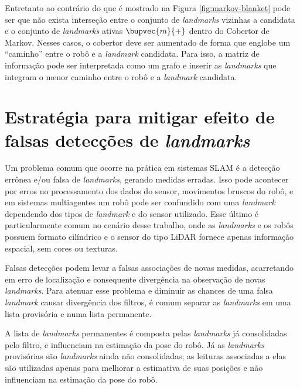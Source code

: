 Entretanto ao contrário do que é mostrado na Figura \ref{fig:markov-blanket} 
pode ser que não exista interseção entre o conjunto de \textit{landmarks} 
vizinhas a candidata e o conjunto de \textit{landmarks} ativas $\bupvec{m}{+}$ 
dentro do Cobertor de Markov. Nesses casos, o cobertor deve ser aumentado de 
forma que englobe um ``caminho'' entre o robô e a \textit{landmark} candidata. 
Para isso, a matriz de informação pode ser interpretada como um grafo e inserir 
as \textit{landmarks} que integram o menor caminho entre o robô e a 
\textit{landmark} candidata.

\section{Estratégia para mitigar efeito de falsas detecções de \textit{landmarks}}
\label{sec:false-detection-handling-strategy}
Um problema comum que ocorre na prática em sistemas SLAM é a detecção 
errônea e/ou falsa de \textit{landmarks}, gerando medidas erradas. Isso pode 
acontecer por erros no processamento dos dados do sensor, movimentos bruscos 
do robô, e em sistemas multiagentes um robô pode ser confundido com uma \textit{landmark} dependendo dos tipos de \textit{landmark} e do sensor utilizado. 
Esse último é particularmente comum no cenário desse trabalho, onde as \textit{landmarks} e os robôs possuem formato cilíndrico e o sensor do tipo LiDAR 
fornece apenas informação espacial, sem cores ou texturas.

Falsas detecções podem levar a falsas associações de novas medidas, 
acarretando em erro de localização e consequente divergência na 
observação de novas \textit{landmarks}. Para atenuar esse problema e 
diminuir as chances de uma falsa \textit{landmark} causar 
divergência dos filtros, é comum separar as \textit{landmarks} em uma lista provisória e numa lista permanente.

A lista de \textit{landmarks} permanentes é composta pelas 
\textit{landmarks} já consolidadas pelo filtro, e influenciam 
na estimação da pose do robô. Já as \textit{landmarks} 
provisórias são \textit{landmarks} ainda não consolidadas; as leituras 
associadas a elas são utilizadas apenas para melhorar a estimativa de 
suas posições e não influenciam na estimação da pose do robô.

